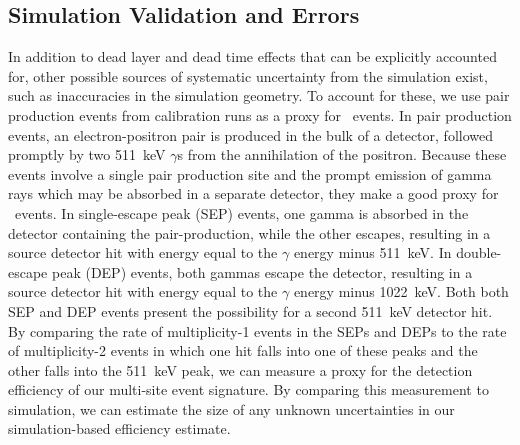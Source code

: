 \documentclass[/main.tex]{subfiles}
\begin{document}
\subsection{Simulation Validation and Errors} \label{sec:Co56}
In addition to dead layer and dead time effects that can be explicitly accounted for, other possible sources of systematic uncertainty from the simulation exist, such as inaccuracies in the simulation geometry.
To account for these, we use pair production events from calibration runs as a proxy for \bbes\ events.
In pair production events, an electron-positron pair is produced in the bulk of a detector, followed promptly by two 511~keV $\gamma$s from the annihilation of the positron.
Because these events involve a single pair production site and the prompt emission of gamma rays which may be absorbed in a separate detector, they make a good proxy for \bbes\ events.
In single-escape peak (SEP) events, one gamma is absorbed in the detector containing the pair-production, while the other escapes, resulting in a source detector hit with energy equal to the $\gamma$ energy minus 511~keV.
In double-escape peak (DEP) events, both gammas escape the detector, resulting in a source detector hit with energy equal to the $\gamma$ energy minus 1022~keV.
Both both SEP and DEP events present the possibility for a second 511~keV detector hit.
By comparing the rate of multiplicity-1 events in the SEPs and DEPs to the rate of multiplicity-2 events in which one hit falls into one of these peaks and the other falls into the 511~keV peak, we can measure a proxy for the detection efficiency of our multi-site event signature.
By comparing this measurement to simulation, we can estimate the size of any unknown uncertainties in our simulation-based efficiency estimate.
\end{document}
